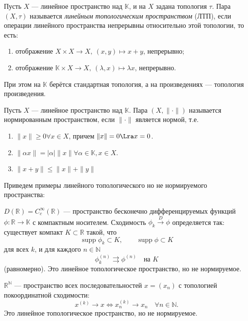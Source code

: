 \begin{definition}
    Пусть \(X\) — линейное пространство над \(\mathbb K\), и на \(X\) задана топология \(\tau\). Пара \((X,\tau)\) называется \emph{линейным топологическим пространством} (ЛТП), если операции линейного пространства непрерывны относительно этой топологии, то есть:
    \begin{enumerate}
        \item отображение \(X\times X\to X,\ (x,y)\mapsto x+y\), непрерывно;
        \item отображение \(\mathbb K\times X\to X,\ (\lambda,x)\mapsto \lambda x\), непрерывно.
    \end{enumerate}
    При этом на \(\mathbb K\) берётся стандартная топология, а на произведениях — топология произведения.
\end{definition}

\begin{definition}
    Пусть \(X\) --- линейное пространство над \(\mathbb{K}\). Пара \((X, \|\cdot\|)\) называется нормированным пространством, если \(\|\cdot\|\) является нормой, т.е.
    \begin{enumerate}
        \item \(\|x\| \ge 0 \forall x \in X\), причем \(\|x\| = 0 \Lra x = 0\).
        \item \(\|\alpha x\| = |\alpha|\|x\| \forall \alpha \in \mathbb{K}, x \in X\).
        \item \(\|x + y\| \le \|x\| + \|y\|\)
    \end{enumerate}
\end{definition}

Приведем примеры линейного топологического но не нормируемого пространства:

\begin{example}
    \(D(\mathbb R)=C_c^\infty(\mathbb R)\) — пространство бесконечно
    дифференцируемых функций \(\phi:\mathbb R\to\mathbb K\) с компактным
    носителем. Сходимость \(\phi_k \xrightarrow{D} \phi\) определяется так:
    существует компакт \(K\subset \mathbb R\) такой, что
    \[
        \operatorname{supp}\phi_k \subset K,\qquad
        \operatorname{supp}\phi \subset K
    \]
    для всех \(k\), и для каждого \(n\in\mathbb N\)
    \[
        \phi_k^{(n)} \rightrightarrows \phi^{(n)}
        \quad \text{на } K
    \]
    (равномерно). Это линейное топологическое пространство, но не
    нормируемое.
\end{example}

\begin{example}
    \(\mathbb R^{\mathbb N}\) — пространство всех последовательностей \(x=(x_n)\) с топологией покоординатной сходимости:
    \[
        x^{(k)}\to x \iff x_n^{(k)}\to x_n \quad \forall n\in\mathbb N.
    \]
    Это линейное топологическое пространство, но не нормируемое.
\end{example}

